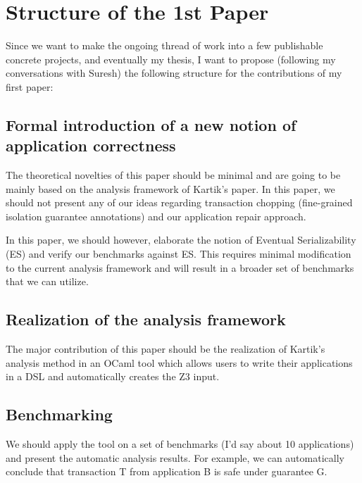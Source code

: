 \documentclass[12pt,letter]{article}
\begin{document}

\section{Structure of the 1st Paper}
Since we want to make the ongoing thread of work into a few publishable concrete
projects, and eventually my thesis, I want to propose (following my
conversations with Suresh) the following structure for the contributions of my first paper:

\subsection{Formal introduction of a new notion of application correctness }
The theoretical novelties of this paper should be minimal and are going to be mainly based
on the analysis framework of Kartik's paper. 
In this paper, we should not
present any of our ideas regarding transaction chopping (fine-grained
isolation guarantee annotations) and our application repair approach.

In this paper, we should however, elaborate the notion of Eventual
Serializability (ES) and verify our benchmarks against ES. This requires
minimal modification to the current analysis framework and will result in a
broader set of benchmarks that we can utilize.

\subsection{Realization of the analysis framework}
The major contribution of this paper should be the realization of Kartik's
analysis method in an OCaml tool which allows users to write their applications
in a DSL and automatically creates the Z3 input.

\subsection{Benchmarking}
We should apply the tool on a set of benchmarks (I'd say about 10 applications)
and present the automatic analysis results. For example, we can automatically
conclude that transaction T from application B is safe under guarantee G. 
\end{document}
